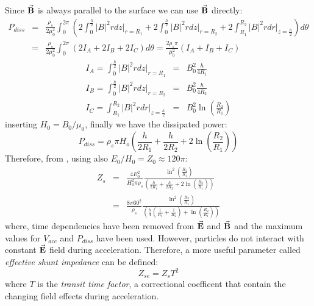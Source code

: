 \documentclass{article}
\begin{document}
Since $\vec{\textbf{B}}$ is always parallel to the surface we can use $\vec{\textbf{B}}$ directly:
\begin{eqnarray}
    P_{diss} &=& \frac{\rho_s}{2\mu_0^2} \int_0^{2\pi} (
                   2\int_{0}^{\frac{h}{2}} |B|^2 r dz \Big|_{r=R_1}
                 + 2\int_{0}^{\frac{h}{2}} |B|^2 r dz \Big|_{r=R_2} 
                 + 2\int_{R_1}^{R_2} |B|^2 r dr \Big|_{z=\frac{h}{2}})d\theta \nonumber\\
             &=& \frac{\rho_s}{2\mu_0^2} \int_0^{2\pi} (2I_A + 2I_B + 2I_C)d\theta 
                 = \frac{2\rho_s \pi}{\mu_0^2}(I_A + I_B + I_C)
\end{eqnarray}
\begin{eqnarray}
    I_A = \int_{0}^{\frac{h}{2}} |B|^2 r dz \Big|_{r=R_1} &=& B_0^2 \frac{h}{4R_1} \\
    I_B = \int_{0}^{\frac{h}{2}} |B|^2 r dz \Big|_{r=R_2} &=& B_0^2 \frac{h}{4R_2} \\
    I_C = \int_{R_1}^{R_2} |B|^2 r dr \Big|_{z=\frac{h}{2}} &=& B_0^2 \ln(\frac{R_2}{R_1})
\end{eqnarray}
inserting $H_0=B_0/\mu_0$, finally we have the dissipated power:
\begin{equation} \label{eq:p_diss}
    P_{diss} = \rho_s \pi H_o ( \frac{h}{2R_1} + \frac{h}{2R_2} + 2\ln(\frac{R_2}{R_1}) )
\end{equation}
Therefore, from , using  also $E_0/H_0 = Z_0 \approx 120 \pi$:
\begin{eqnarray}
    Z_s &=& \frac{4E_0^2}{H_0^2 \pi \rho_s} \frac{ \ln^2(\frac{R_2}{R_1})}{(\frac{h}{2R_1} + \frac{h}{2R_2} + 2 \ln(\frac{R_2}{R_1}))} \\
        &=& \frac{8 \pi 60^2}{\rho_s} \frac{ \ln^2(\frac{R_2}{R_1})}{(\frac{h}{4}(\frac{1}{R_1} + \frac{1}{R_2}) + \ln(\frac{R_2}{R_1}))}
\end{eqnarray}
where, time dependencies have been removed from $\vec{\textbf{E}}$ and $\vec{\textbf{B}}$ 
and the maximum values for $V_{acc}$ and $P_{diss}$ have been used. 
However, particles do not interact with constant $\vec{\textbf{E}}$ field during acceleration. 
Therefore, a more useful parameter called \textit{effective shunt impedance} can be defined:
\begin{equation}
    Z_{se} = Z_s T^2
\end{equation}
where $T$ is the \textit{transit time factor}, a correctional coefficent that contain the changing field effects during acceleration.
\end{document}
